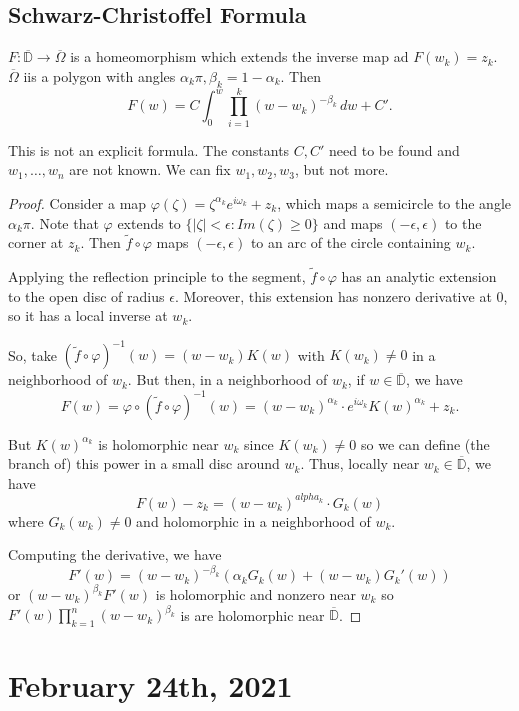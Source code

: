 \documentclass[12pt]{scrartcl}
\renewcommand{\tilde}{\widetilde}
\let \phi \varphi
\let \ol \overline
\begin{document}
\subsection{Schwarz-Christoffel Formula}
$F: \ol{\mathbb D }\to \ol{\Omega}$ is a homeomorphism which extends the inverse map ad $F(w_k) = z_k$.  $\ol{\Omega}$ iis a polygon with angles $\alpha_k \pi, \beta_k = 1 - \alpha_k$.  Then
$$F(w) =C \int_{0}^w \prod_{i=1}^k (w - w_k)^{-\beta_k}\,dw + C'.$$
\begin{remark}  This is not an explicit formula.  The constants $C, C'$ need to be found and $w_1, \dots, w_n$ are not known.  We can fix $w_1, w_2, w_3$, but not more.  
\end{remark}
\begin{proof}
Consider a map $\phi(\zeta) = \zeta^{\alpha_k} e^{i \omega_k} + z_k$, which maps a semicircle to the angle $\alpha_k \pi$.  Note that $\phi$ extends to $\{|\zeta| < \epsilon: Im(\zeta) \ge 0\}$ and maps $(-\epsilon, \epsilon) $ to the corner at $z_k$.  Then $\tilde{f} \circ \phi$ maps $(-\epsilon, \epsilon)$ to an arc of the circle containing $w_k$.

Applying the reflection principle to the segment, $\tilde{f} \circ \phi$ has an analytic extension to the open disc of radius $\epsilon$.  Moreover, this extension has nonzero derivative at $0$, so it has a local inverse at $w_k$.

So, take $(\tilde{f} \circ \phi)^{-1}(w) = (w - w_k) K(w)$ with $K(w_k) \ne 0$ in a neighborhood of $w_k$.  But then, in a neighborhood of $w_k$, if $w \in \ol{\mathbb D}$, we have $$F(w) = \phi \circ (\tilde{f} \circ \phi)^{-1}(w) = (w - w_k)^{\alpha_k} \cdot e^{i\omega_k}K(w)^{\alpha_k} + z_k.$$

But $K(w)^{\alpha_k}$ is holomorphic near $w_k$ since $K(w_k) \ne 0$ so we can define (the branch of) this power in a small disc around $w_k$.  Thus, locally near $w_k \in \ol{\mathbb D}$, we have 
$$F(w) - z_k = (w - w_k)^{alpha_k} \cdot G_k(w)$$
where $G_k(w_k) \ne 0$ and holomorphic in a neighborhood of $w_k$.

Computing the derivative, we have 
$$F'(w) = (w - w_k)^{-\beta_k}(\alpha_k G_k(w) + (w - w_k)G_k'(w))$$
or $(w - w_k)^{\beta_k}F'(w)$ is holomorphic and nonzero near $w_k$ so 
$F'(w) \prod_{k=1}^n (w - w_k)^{\beta_k}$ is are holomorphic near $\ol{\mathbb D}$.  
\end{proof}  
\pagebreak
\section{February 24th, 2021}
\end{document}

